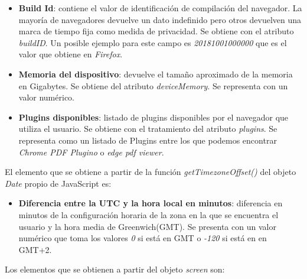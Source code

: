 \begin{itemize}
    \item \textbf{Build Id}: contiene el valor de identificación de compilación del navegador. La mayoría de navegadores devuelve un dato indefinido pero otros devuelven una marca de tiempo fija como medida de privacidad. Se obtiene con el atributo \textit{buildID}. Un posible ejemplo para este campo es \textit{20181001000000} que es el valor que obtiene en \textit{Firefox}. 
    \item \textbf{Memoria del dispositivo}: devuelve el tamaño aproximado de la memoria en Gigabytes. Se obtiene del atributo \textit{deviceMemory}. Se representa con un valor numérico.
     \item \textbf{Plugins disponibles}: listado de plugins disponibles por el navegador que utiliza el usuario. Se obtiene con el tratamiento del atributo \textit{plugins}. Se representa como un listado de Plugins entre los que podemos encontrar \textit{Chrome PDF Plugino} o \textit{edge pdf viewer}.
\end{itemize}
\noindent El elemento que se obtiene a partir de la función \textit{getTimezoneOffset()} del objeto \textit{Date} propio de JavaScript es:
\begin{itemize} 
    \item \textbf{Diferencia entre la UTC y la hora local en minutos}: diferencia en minutos de la configuración horaria de la zona en la que se encuentra el usuario y la hora media de Greenwich(GMT). Se presenta con un valor numérico que toma los valores \textit{0} si está en GMT o \textit{-120} si está en en GMT+2.
\end{itemize}
\noindent  Los elementos que se obtienen a partir del objeto \textit{screen}\cite{screen} son:

